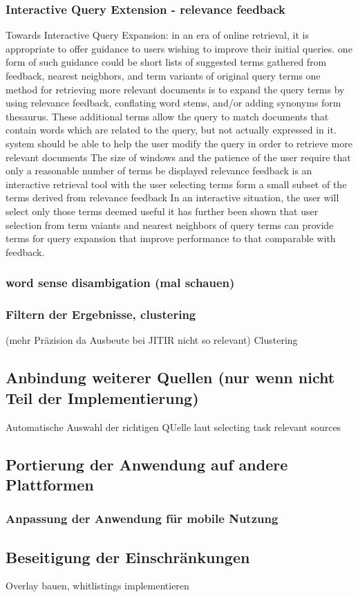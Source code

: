   \subsubsection{Interactive Query Extension - relevance feedback}
 				Towards Interactive Query Expansion:
  in an era of online retrieval, it is appropriate to offer guidance to users wishing to improve their initial queries. one form of such guidance could be short lists of suggested terms gathered from feedback, nearest neigbhors, and term variants of original query terms
  one method for retrieving more relevant documents is to expand the query terms by using relevance feedback, conflating word stems, and/or adding synonyms form thesaurus. These additional terms allow the query to match documents that contain words which are related to the query, but not actually expressed in it. 
  system should be able to help the user modify the query in order to retrieve more relevant documents
  The size of windows and the patience of the user require that only a reasonable number of terms be displayed
  relevance feedback is an interactive retrieval tool
  with the user selecting terms form a small subset of the terms derived from relevance feedback
  In an interactive situation, the user will select only those terms deemed useful
  it has further been shown that user selection from term vaiants and nearest neighbors of query terms can provide terms for query expansion that improve performance to that comparable with feedback.


  \subsubsection{word sense disambigation (mal schauen)}
	 \cite{budzik2000user}

  \subsubsection{Filtern der Ergebnisse, clustering}
 		(mehr Präzision da Ausbeute bei JITIR nicht so relevant) Clustering\cite{budzik2000user}

 \subsection{Anbindung weiterer Quellen (nur wenn nicht Teil der Implementierung)}
	Automatische Auswahl der richtigen QUelle laut selecting task relevant sources

 \subsection{Portierung der Anwendung auf andere Plattformen}
  \subsubsection{Anpassung der Anwendung für mobile Nutzung}

 \subsection{Beseitigung der Einschränkungen}
 Overlay bauen, whitlistings implementieren

